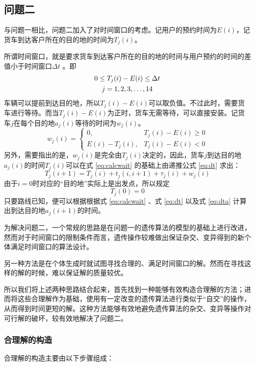 \documentclass[UTF8,cs4size]{ctexart}
\begin{document}
\subsection{问题二}
与问题一相比，问题二加入了对时间窗口的考虑。记用户的预约时间为$E(i)$，记货车到达客户所在的目的地的时间为$T_j(i)$。

所谓时间窗口，就是要求货车到达客户所在的目的地的时间与用户预约的时间的差值小于时间窗口$\Delta t$ 。即
\begin{gather}\label{eq:timewindow}
  0 \leq T_j(i) - E(i) \leq \Delta t  \\
  j = 1, 2, 3, \ldots, 14 \notag
\end{gather}
车辆可以提前到达目的地，所以$T_j(i) - E(i)$可以取负值。不过此时，需要货车进行等待。而当$T_j(i) - E(i)$为正时，货车无需等待，可以直接安装。记货车$j$在每个目的地$a_j(i)$等待的时间为$w_j(i)$。
\begin{equation} \label{eq:calcwait}
  w_j(i) = \begin{cases}
    0, & T_j(i) - E(i) \geq  0 \\
    E(i) - T_j(i), & T_j(i) - E(i) < 0
  \end{cases}
\end{equation}
另外，需要指出的是，$w_j(i)$是完全由$T_j(i)$决定的，因此，货车$j$到达目的地$a_j(i)$的时间$T_j(i)$可以在式 \ref{eq:calcwait} 的基础上由递推公式 \ref{eq:dt} 求出：
\begin{equation} \label{eq:dt}
  T_j(i+1)=T_j(i)+t_j(i,i+1)+\tau _j(i) + w_j(i)
\end{equation}
由于$i=0$时对应的“目的地”实际上是出发点，所以规定
\begin{equation} \label{eq:dta}
  T_j(0) = 0
\end{equation}
只要路线已知，便可以根据根据式 \ref{eq:calcwait} 、式 \ref{eq:dt} 以及式 \ref{eq:dta} 计算出到达目的地$a_j(i+1)$的时间。

为解决问题二，一个常规的思路是在问题一的遗传算法的模型的基础上进行改进，然而对于时间窗口的限制条件而言，遗传操作较难做出保证杂交、变异得到的新个体满足时间窗口的算法设计。

另一种方法是在个体生成时就试图寻找合理的、满足时间窗口的解。然而在寻找这样的解的时候，难以保证解的质量较优。

所以我们将上述两种思路结合起来，首先找到一种能够有效构造合理解的方法；进而将这些合理解作为基础，使用有一定改变的遗传算法进行类似于“自交”的操作，从而得到时间更短的解。这种方法能够有效地避免遗传算法的杂交、变异等操作对可行解的破坏，较有效地解决了问题二。
\subsubsection{合理解的构造}
合理解的构造主要由以下步骤组成：
\end{document}
